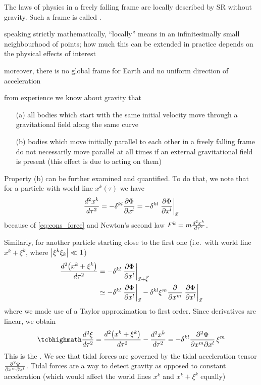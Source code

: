 \begin{prop}
The laws of physics in a freely falling frame are locally described by SR without gravity. Such a frame is called .
\end{prop}
speaking strictly mathematically, \enquote{locally} means in an infinitesimally small neighbourhood of points; how much this can be extended in practice depends on the physical effects of interest

moreover, there is no global frame for Earth and no uniform direction of acceleration



from experience we know about gravity that
\begin{itemize}
\item[(a)] all bodies which start with the same initial velocity move through a gravitational field along the same curve

\item[(b)] bodies which move initially parallel to each other in a freely falling frame do not necessarily move parallel at all times if an external gravitational field is present (this effect is due to  acting on them)
\end{itemize}

Property (b) can be further examined and quantified. To do that, we note that for a particle with world line $x^k(\tau)$ we have
\begin{equation*}
\dv[2]{x^k}{\tau} = - \delta^{k l} \pdv{\Phi}{x^l} = - \delta^{k l} \eval{\pdv{\Phi}{x^l}}_{\vec{x}}
\end{equation*}
because of \eqref{eq:cons_force} and Newton's second law $F^k = m \dv[2]{x^k}{\tau}$.

Similarly, for another particle starting close to the first one (i.e.~with world line $x^k + \xi^k$, where $\abs{\xi^k \xi_k} \ll 1$)
\begin{align*}
\dv[2]{\qty(x^k + \xi^k)}{\tau} &= - \delta^{k l} \eval{\pdv{\Phi}{x^l}}_{\vec{x} + \vec{\xi}}
\\
&\simeq - \delta^{k l} \eval{\pdv{\Phi}{x^l}}_{\vec{x}} - \delta^{k l} \xi^m \pdv{x^m} \eval{\pdv{\Phi}{x^l}}_{\vec{x}}
\end{align*}
where we made use of a Taylor approximation to first order. Since derivatives are linear, we obtain
\begin{equation}\label{eq:tidal_newton}
\eqbox{
\dv[2]{\xi}{\tau} = \dv[2]{\qty(x^k + \xi^k)}{\tau} - \dv[2]{x^k}{\tau} = - \delta^{k l} \pdv[2]{\Phi}{x^m}{x^l} \, \xi^m
}
\end{equation}
This is the . We see that tidal forces are governed by the tidal acceleration tensor $\pdv[2]{\Phi}{x^m}{x^l}$. Tidal forces are a way to detect gravity as opposed to constant acceleration (which would affect the world lines $x^k$ and $x^k + \xi^k$ equally)




